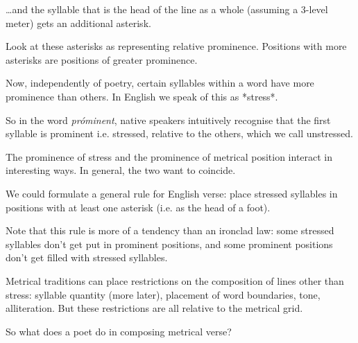 …and the syllable that is the head of the line as a whole (assuming a 3-level meter) gets an additional asterisk.

Look at these asterisks as representing relative prominence. Positions with more asterisks are positions of greater prominence.

Now, independently of poetry, certain syllables within a word have more prominence than others. In English we speak of this as *stress*.

So in the word \textit{próminent}, native speakers intuitively recognise that the first syllable is prominent i.e. stressed, relative to the others, which we call unstressed.

The prominence of stress and the prominence of metrical position interact in interesting ways. In general, the two want to coincide.

We could formulate a general rule for English verse: place stressed syllables in positions with at least one asterisk (i.e. as the head of a foot).

Note that this rule is more of a tendency than an ironclad law: some stressed syllables don’t get put in prominent positions, and some prominent positions don’t get filled with stressed syllables.

Metrical traditions can place restrictions on the composition of lines other than stress: syllable quantity (more later), placement of word boundaries, tone, alliteration. But these restrictions are all relative to the metrical grid.

So what does a poet do in composing metrical verse?



    
